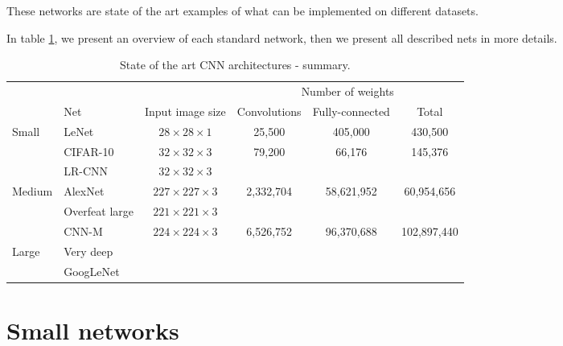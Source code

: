 These networks are state of the art examples of what can be implemented on different datasets. 

In table \ref{table:summary_SoA_nets}, we present an overview of each standard network, then we present all described nets in more details. 


\begin{table}[h]
\begin{center}
 \begin{tabular}{|l|l||c||c|c|c|}
  \hline
  &                                          &                           & \multicolumn{3}{c|}{Number of weights}        \\
  \cline{4-6}
  & Net                                      & Input image size          & Convolutions & Fully-connected & Total       \\
  \hline
  \multirow{3}{*}{Small}
  & LeNet \cite{MNIST}                       & $28 \times 28 \times 1$   & 25,500       & 405,000         & 430,500     \\ 
  & CIFAR-10 \cite{CIFAR}                    & $32 \times 32 \times 3$   & 79,200       & 66,176          & 145,376     \\
  & LR-CNN \cite{Chevalier15}                & $32 \times 32 \times 3$   &  &  & \\
  \hline
  \multirow{3}{*}{Medium}
  & AlexNet \cite{Krizhevsky12}              & $227 \times 227 \times 3$ & 2,332,704    & 58,621,952      & 60,954,656 \\
  & Overfeat large \cite{Sermanet14overfeat} & $221 \times 221 \times 3$ &  &  & \\
  & CNN-M \cite{Chatfield14}                 & $224 \times 224 \times 3$ & 6,526,752 & 96,370,688 & 102,897,440 \\
  \hline
  \multirow{2}{*}{Large}
  & Very deep                                &                           &  &  & \\ 
  & GoogLeNet                                &                           &  &  & \\
  \hline
 \end{tabular}
 \caption{State of the art CNN architectures - summary.}
 \label{table:summary_SoA_nets}
\end{center}
\end{table}









\section{Small networks}

